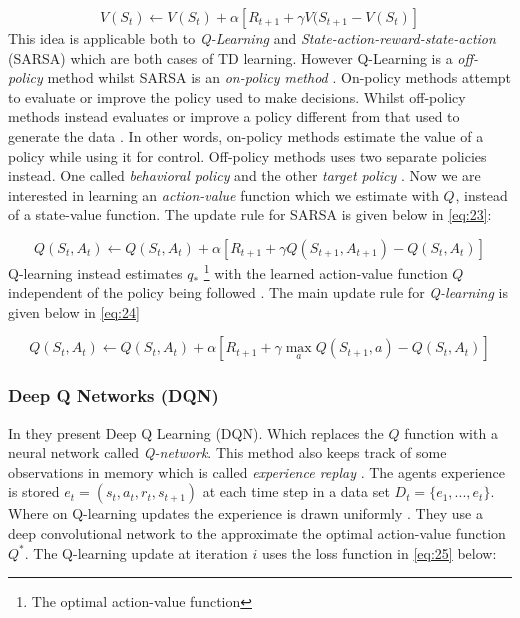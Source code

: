 \documentclass{kththesis}
\theoremstyle{definition}
\begin{document}
\begin{equation}
    \label{eq:22}
    V(S_t) \leftarrow V(S_t) + \alpha \left[R_{t+1} + \gamma V(S_{t+1} - V(S_t) \right]
\end{equation}
This idea is applicable both to \textit{Q-Learning} and \textit{State-action-reward-state-action} (SARSA) which are both cases of TD learning. However Q-Learning is a \textit{off-policy} method whilst SARSA is an \textit{on-policy method} \parencite{sutton1998reinforcement, arulkumaran2017brief}. On-policy methods attempt to evaluate or improve the policy used to make decisions. Whilst off-policy methods instead evaluates or improve a policy different from that used to generate the data \parencite{sutton1998reinforcement}. In other words, on-policy methods estimate the value of a policy while using it for control. Off-policy methods uses two separate policies instead. One called \textit{behavioral policy} and the other \textit{target policy} \parencite{sutton1998reinforcement}. Now we are interested in learning an \textit{action-value} function which we estimate with $Q^{}$, instead of a state-value function. The update rule for SARSA is given below in \autoref{eq:23}:

\begin{equation}
    \label{eq:23}
    Q(S_t, A_t) \leftarrow Q(S_t, A_t) + \alpha \left[R_{t+1} + \gamma Q(S_{t+1}, A_{t+1}) - Q(S_t, A_t) \right]
\end{equation}
Q-learning instead estimates  $q_{*}$ \footnote{The optimal action-value function} with the learned action-value function $Q$ independent of the policy being followed \parencite{sutton1998reinforcement}. 
The main update rule for \textit{Q-learning} is given below in \autoref{eq:24}

\begin{equation}
    \label{eq:24}
     Q(S_t, A_t) \leftarrow Q(S_t, A_t) + \alpha \left[R_{t+1} + \gamma \underset{a}{\operatorname{max}} Q(S_{t+1}, a) - Q(S_t, A_t) \right]
\end{equation}

\subsubsection*{Deep Q Networks (DQN)}
In \textcite{mnih2015human} they present Deep Q Learning (DQN). Which replaces the $Q$ function with a neural network called \textit{Q-network}. This method also keeps track of some observations in memory which is called \textit{experience replay} \parencite{mnih2015human}. The agents experience is stored $e_t = (s_t, a_t, r_t, s_{t+1})$ at each time step in a data set $D_t = \{e_1, ..., e_t\}$. Where on Q-learning updates the experience is drawn uniformly \parencite{mnih2015human}. They use a deep convolutional network to the approximate the optimal action-value function $Q^{*}$. The Q-learning update at iteration $i$ uses the loss function in \autoref{eq:25} below:
\end{document}
